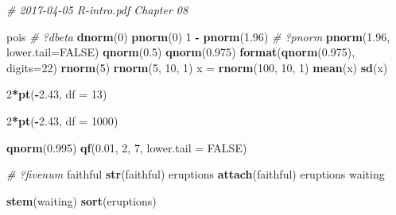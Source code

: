 \documentclass[10pt,]{krantz}
\makeatletter
\newenvironment{Shaded}{\begin{snugshade}}{\end{snugshade}}
\newcommand{\KeywordTok}[1]{\textcolor[rgb]{0.13,0.29,0.53}{\textbf{#1}}}
\newcommand{\DataTypeTok}[1]{\textcolor[rgb]{0.13,0.29,0.53}{#1}}
\newcommand{\DecValTok}[1]{\textcolor[rgb]{0.00,0.00,0.81}{#1}}
\newcommand{\FloatTok}[1]{\textcolor[rgb]{0.00,0.00,0.81}{#1}}
\newcommand{\StringTok}[1]{\textcolor[rgb]{0.31,0.60,0.02}{#1}}
\newcommand{\CommentTok}[1]{\textcolor[rgb]{0.56,0.35,0.01}{\textit{#1}}}
\newcommand{\OtherTok}[1]{\textcolor[rgb]{0.56,0.35,0.01}{#1}}
\newcommand{\OperatorTok}[1]{\textcolor[rgb]{0.81,0.36,0.00}{\textbf{#1}}}
\newcommand{\NormalTok}[1]{#1}
\newenvironment{kframe}{%
\medskip{}
\setlength{\fboxsep}{.8em}
 \def\at@end@of@kframe{}%
 \ifinner\ifhmode%
  \def\at@end@of@kframe{\end{minipage}}%
  \begin{minipage}{\columnwidth}%
 \fi\fi%
 \def\FrameCommand##1{\hskip\@totalleftmargin \hskip-\fboxsep
 \colorbox{shadecolor}{##1}\hskip-\fboxsep
     \hskip-\linewidth \hskip-\@totalleftmargin \hskip\columnwidth}%
 \MakeFramed {\advance\hsize-\width
   \@totalleftmargin\z@ \linewidth\hsize
   \@setminipage}}%
 {\par\unskip\endMakeFramed%
 \at@end@of@kframe}
\renewenvironment{Shaded}{\begin{kframe}}{\end{kframe}}
\theoremstyle{definition}
\theoremstyle{definition}
\theoremstyle{remark}
\makeatother
\begin{document}
\begin{Shaded}
\begin{Highlighting}[]

\CommentTok{# 2017-04-05 R-intro.pdf Chapter 08}

\NormalTok{pois}
\CommentTok{# ?dbeta}
\KeywordTok{dnorm}\NormalTok{(}\DecValTok{0}\NormalTok{)}
\KeywordTok{pnorm}\NormalTok{(}\DecValTok{0}\NormalTok{)}
\DecValTok{1} \OperatorTok{-}\StringTok{ }\KeywordTok{pnorm}\NormalTok{(}\FloatTok{1.96}\NormalTok{)}
\CommentTok{# ?pnorm}
\KeywordTok{pnorm}\NormalTok{(}\FloatTok{1.96}\NormalTok{, }\DataTypeTok{lower.tail=}\OtherTok{FALSE}\NormalTok{)}
\KeywordTok{qnorm}\NormalTok{(}\FloatTok{0.5}\NormalTok{)}
\KeywordTok{qnorm}\NormalTok{(}\FloatTok{0.975}\NormalTok{)}
\KeywordTok{format}\NormalTok{(}\KeywordTok{qnorm}\NormalTok{(}\FloatTok{0.975}\NormalTok{), }\DataTypeTok{digits=}\DecValTok{22}\NormalTok{)}
\KeywordTok{rnorm}\NormalTok{(}\DecValTok{5}\NormalTok{)}
\KeywordTok{rnorm}\NormalTok{(}\DecValTok{5}\NormalTok{, }\DecValTok{10}\NormalTok{, }\DecValTok{1}\NormalTok{)}
\NormalTok{x =}\StringTok{ }\KeywordTok{rnorm}\NormalTok{(}\DecValTok{100}\NormalTok{, }\DecValTok{10}\NormalTok{, }\DecValTok{1}\NormalTok{)}
\KeywordTok{mean}\NormalTok{(x)}
\KeywordTok{sd}\NormalTok{(x)}

\DecValTok{2}\OperatorTok{*}\KeywordTok{pt}\NormalTok{(}\OperatorTok{-}\FloatTok{2.43}\NormalTok{, }\DataTypeTok{df =} \DecValTok{13}\NormalTok{)}

\DecValTok{2}\OperatorTok{*}\KeywordTok{pt}\NormalTok{(}\OperatorTok{-}\FloatTok{2.43}\NormalTok{, }\DataTypeTok{df =} \DecValTok{1000}\NormalTok{)}

\KeywordTok{qnorm}\NormalTok{(}\FloatTok{0.995}\NormalTok{)}
\KeywordTok{qf}\NormalTok{(}\FloatTok{0.01}\NormalTok{, }\DecValTok{2}\NormalTok{, }\DecValTok{7}\NormalTok{, }\DataTypeTok{lower.tail =} \OtherTok{FALSE}\NormalTok{)}

\CommentTok{# ?fivenum}
\NormalTok{faithful}
\KeywordTok{str}\NormalTok{(faithful)}
\NormalTok{eruptions}
\KeywordTok{attach}\NormalTok{(faithful)}
\NormalTok{eruptions}
\NormalTok{waiting}

\KeywordTok{stem}\NormalTok{(waiting)}
\KeywordTok{sort}\NormalTok{(eruptions)}


\end{Highlighting}
\end{Shaded}
\end{document}

